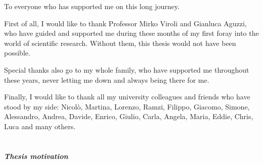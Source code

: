 \documentclass[12pt,a4paper,openright,twoside]{book}
\begin{document}
\begin{dedication} 
To everyone who has supported me on this long journey.
\end{dedication}

\begin{acknowledgements}
First of all, I would like to thank Professor Mirko Viroli and Gianluca Aguzzi, who have guided and supported 
    me during these months of my first foray into the world of scientific research. Without them, 
    this thesis would not have been possible.

Special thanks also go to my whole family, who have supported me throughout these years, never letting 
    me down and always being there for me.
    
Finally, I would like to thank all my university colleagues and friends who have stood by my side: 
    Nicolò, Martina, Lorenzo, Ramzi, Filippo, Giacomo, Simone, Alessandro, Andrea, Davide, 
    Enrico, Giulio, Carla, Angela, Maria, Eddie, Chris, Luca and many others.


\end{acknowledgements}

\tableofcontents   
\listoffigures     
\lstlistoflistings 

\mainmatter

\chapter{\introductionname}
\label{chap:introduction}


\paragraph{Thesis motivation}
\end{document}
